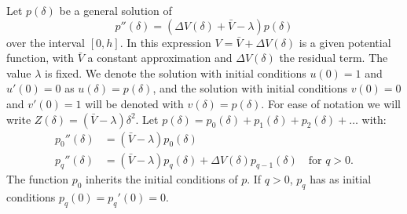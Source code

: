 \begin{theorem}[Ixaru 1984]\label{the:c2_perturbation_terms}
    Let $p(\delta)$ be a general solution of
    $$
        p''(\delta) = \left(\Delta V(\delta) + \bar{V} - \lambda\right)p(\delta)
    $$
    over the interval $[0, h]$. In this expression $V = \bar{V} + \Delta V(\delta)$ is a given potential function, with $\bar{V}$ a constant approximation and $\Delta V(\delta)$ the residual term. The value $\lambda$ is fixed. We denote the solution with initial conditions $u(0) = 1$ and $u'(0)=0$ as $u(\delta) = p(\delta)$, and the solution with initial conditions $v(0) = 0$ and $v'(0) = 1$ will be denoted with $v(\delta) = p(\delta)$. For ease of notation we will write $Z(\delta) = \left(\bar{V} - \lambda\right)\delta^2$. Let $p(\delta) = p_0(\delta) + p_1(\delta) + p_2(\delta) + \dots$ with:
    \begin{align*}
        p_0''(\delta) & = (\bar{V} - \lambda) p_0(\delta)                                                             \\
        p_q''(\delta) & = (\bar{V} - \lambda) p_q(\delta) + \Delta V(\delta) p_{q-1}(\delta) \quad\text{for $q > 0$.}
    \end{align*}
    The function $p_0$ inherits the initial conditions of $p$. If $q > 0$, $p_q$ has as initial conditions $p_q(0) = p_q'(0) = 0$.



\end{theorem}
